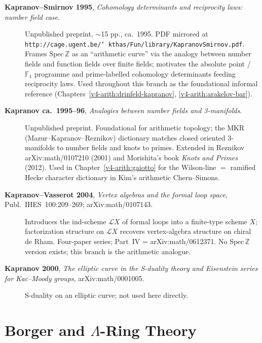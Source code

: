 \begin{description}
\item[\textbf{Kapranov--Smirnov 1995}, \emph{Cohomology determinants
and reciprocity laws: number field case}.] Unpublished preprint,
\(\sim\)15 pp., ca.~1995. PDF mirrored at
\texttt{http://cage.ugent.be/\char`~kthas/Fun/library/KapranovSmirnov.pdf}.
Frames \(\mathrm{Spec}\,\mathbb{Z}\) as an ``arithmetic curve'' via
the analogy between number fields and function fields over finite
fields; motivates the absolute point / \(\mathbb{F}_{1}\) programme
and prime-labelled cohomology determinants feeding reciprocity laws.
Used throughout this branch as the foundational informal reference
(Chapters~\ref{v4-arith:drinfeld-kapranov}, \ref{v4-arith:arakelov-bar}).
\item[\textbf{Kapranov ca.~1995--96}, \emph{Analogies between number
fields and 3-manifolds}.] Unpublished preprint. Foundational for
arithmetic topology; the MKR (Mazur--Kapranov--Reznikov) dictionary
matches closed oriented 3-manifolds to number fields and knots to
primes. Extended in Reznikov arXiv:math/0107210 (2001) and
Morishita's book \emph{Knots and Primes} (2012). Used in
Chapter~\ref{v4-arith:gaiotto} for the Wilson-line \(=\) ramified
Hecke character dictionary in Kim's arithmetic Chern--Simons.
\item[\textbf{Kapranov--Vasserot 2004}, \emph{Vertex algebras and
the formal loop space}, Publ.~IHES~100:209--269;
arXiv:math/0107143.] Introduces the ind-scheme \(\mathcal{L}X\) of
formal loops into a finite-type scheme \(X\); factorization structure
on \(\mathcal{L}X\) recovers vertex-algebra structure on chiral de
Rham. Four-paper series; Part~IV = arXiv:math/0612371. No
\(\mathrm{Spec}\,\mathbb{Z}\) version exists; this branch is the
arithmetic analogue.
\item[\textbf{Kapranov 2000}, \emph{The elliptic curve in the
S-duality theory and Eisenstein series for Kac--Moody groups},
arXiv:math/0001005.] S-duality on an elliptic curve; not used here
directly.
\end{description}

\section{Borger and \(\Lambda\)-Ring Theory}
\label{v4-arith:app:A:borger}

